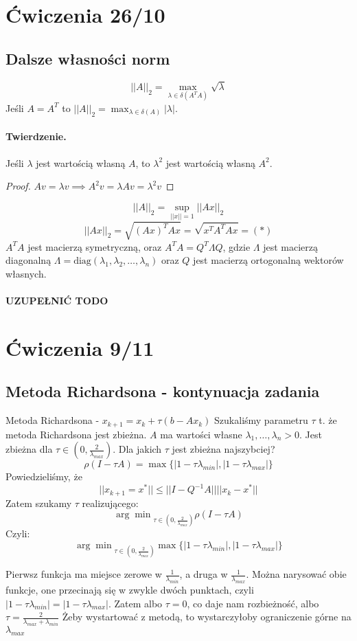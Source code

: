 \documentclass{article}
\begin{document}
\section{Ćwiczenia 26/10}
\subsection{Dalsze własności norm}
$$ ||A||_2=\max_{\lambda\in\delta(A^TA)}\sqrt{\lambda} $$
Jeśli $ A=A^T $ to $ ||A||_2=\max_{\lambda\in\delta(A)}|\lambda| $. 
\paragraph{Twierdzenie.} Jeśli $ \lambda $ jest wartością własną $ A $, to $ \lambda^2 $ jest wartością własną $ A^2 $.\begin{proof}
	$Av=\lambda v \implies A^2v=\lambda Av=\lambda^2v$
\end{proof}
$$ ||A||_2=\sup_{||x||=1}||Ax||_2 $$
$$||Ax||_2=\sqrt{(Ax)^TAx}=\sqrt{x^TA^TAx}=(*)$$
$ A^TA $ jest macierzą symetryczną, oraz $ A^TA=Q^T\Lambda Q $, gdzie $ \Lambda $ jest macierzą diagonalną $ \Lambda=\text{diag}(\lambda_1, \lambda_2, \ldots, \lambda_n) $ oraz $ Q $ jest macierzą ortogonalną wektorów własnych.

\paragraph{UZUPEŁNIĆ TODO}
\section{Ćwiczenia 9/11}
\subsection{Metoda Richardsona - kontynuacja zadania}
Metoda Richardsona - $ x_{k+1}=x_k+\tau(b-Ax_k) $
Szukaliśmy parametru $ \tau $ t. że metoda Richardsona jest zbieżna.
$ A $ ma wartości własne $ \lambda_1, \ldots, \lambda_n>0 $.
Jest zbieżna dla $ \tau\in(0, \frac2{\lambda_{max}}) $. Dla jakich $ \tau $ jest zbieżna najszybciej?
$$\rho(I-\tau A)=\max\{|1-\tau\lambda_{min}|, |1-\tau\lambda_{max}|\}$$
Powiedzieliśmy, że
$$ ||x_{k+1}=x^*||\le||I-Q^{-1}A||||x_k-x^*|| $$
Zatem szukamy $ \tau $ realizującego: 
$$ {\arg\min}_{\tau\in(0, \frac2{\lambda_{max}})}\rho(I-\tau A)$$
Czyli: 
$$ {\arg\min}_{\tau\in(0, \frac2{\lambda_{max}})} \max\{|1-\tau\lambda_{min}|, |1-\tau\lambda_{max}|\} $$

Pierwsz funkcja ma miejsce zerowe w $ \frac1{\lambda_{min}} $, a druga w $ \frac1{\lambda_{max}} $. Można narysować obie funkcje, one przecinają się w zwykle dwóch punktach, czyli $ |1-\tau\lambda_{min}| = |1-\tau\lambda_{max}| $. Zatem albo $ \tau = 0 $, co daje nam rozbieżność, albo $ \tau=\frac2{\lambda_{max}+\lambda_{min}} $ Żeby wystartować z metodą, to wystarczyłoby ograniczenie górne na $ \lambda_{max} $
\end{document}
